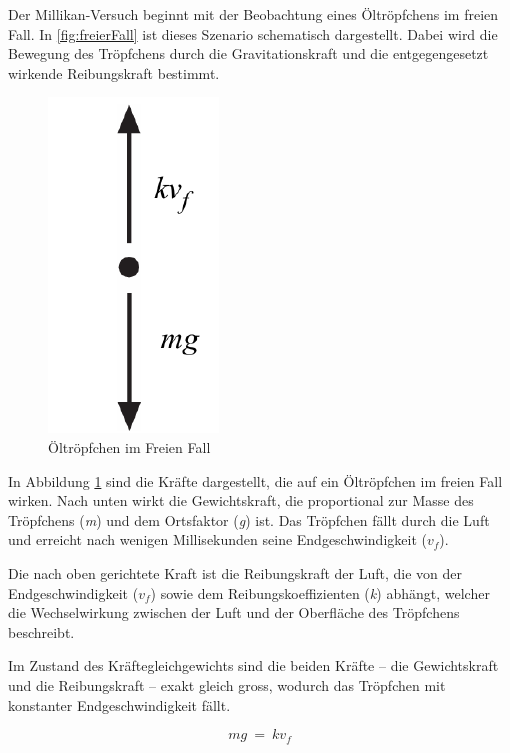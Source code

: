 \noindent Der Millikan-Versuch beginnt mit der Beobachtung eines Öltröpfchens im freien Fall. In \autoref{fig:freierFall} ist dieses Szenario schematisch dargestellt. Dabei wird die Bewegung des Tröpfchens durch die Gravitationskraft und die entgegengesetzt wirkende Reibungskraft bestimmt.

\begin{figure}[h]
	\begin{center}
		\includegraphics[scale=0.5]{bilder/pdf/Abbildung1_FreierFall.pdf}
		\caption{Öltröpfchen im Freien Fall \parencite[1]{instructionManualHalogen}}
		\label{fig:freierFall}
	\end{center}
\end{figure}

\noindent In Abbildung \ref{fig:freierFall} sind die Kräfte dargestellt, die auf ein Öltröpfchen im freien Fall wirken. Nach unten wirkt die Gewichtskraft, die proportional zur Masse des Tröpfchens (\textit{m}) und dem Ortsfaktor (\textit{g}) ist. Das Tröpfchen fällt durch die Luft und erreicht nach wenigen Millisekunden seine Endgeschwindigkeit (\textit{$v_f$}).

Die nach oben gerichtete Kraft ist die Reibungskraft der Luft, die von der Endgeschwindigkeit (\textit{$v_f$}) sowie dem Reibungskoeffizienten (\textit{k}) abhängt, welcher die Wechselwirkung zwischen der Luft und der Oberfläche des Tröpfchens beschreibt.

Im Zustand des Kräftegleichgewichts sind die beiden Kräfte – die Gewichtskraft und die Reibungskraft – exakt gleich gross, wodurch das Tröpfchen mit konstanter Endgeschwindigkeit fällt.

\begin{equation}\label{eq:kräfteFreierFall}
	mg \ = \ kv_f
\end{equation}   

